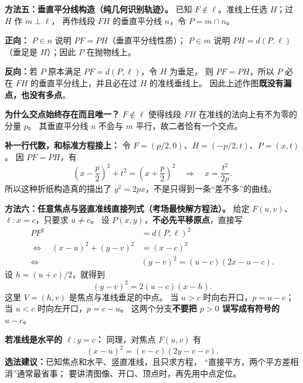 \begin{proofbox}
\textbf{方法五：垂直平分线构造（纯几何识别轨迹）。}
已知 $F\notin\ell$。准线上任选 $H$；过 $H$ 作 $m\perp\ell$，
再作线段 $FH$ 的垂直平分线 $n$，令 $P=m\cap n$。

\textbf{正向：} $P\in n$ 说明 $PF=PH$（垂直平分线性质）；
$P\in m$ 说明 $PH=d(P,\ell)$（垂足是 $H$）；因此 $P$ 在抛物线上。

\textbf{反向：}若 $P$ 原本满足 $PF=d(P,\ell)$，令 $H$ 为垂足，
则 $PF=PH$，所以 $P$ 必在 $FH$ 的垂直平分线上，并且必在过 $H$ 的准线垂线上。
因此上述作图\textbf{既没有漏点，也没有多点}。

\textbf{为什么交点始终存在而且唯一？}
$F\notin\ell$ 使得线段 $FH$ 在准线的法向上有不为零的分量 $p$。
其垂直平分线 $n$ 不会与 $m$ 平行，故二者恰有一个交点。

\textbf{补一行代数，和标准方程接上：}
令 $F=(p/2,0)$、$H=(-p/2,t)$、$P=(x,t)$。
因 $PF=PH$，有
\[
\left(x-\frac p2\right)^2+t^2
=\left(x+\frac p2\right)^2
\quad\Longrightarrow\quad
\boxed{x=\frac{t^2}{2p}}.
\]
所以这种折纸构造真的描出了 $y^2=2px$，不是只得到一条“差不多”的曲线。
\end{proofbox}
\clearpage
\begin{proofbox}
\textbf{方法六：任意焦点与竖直准线直接列式（考场最快解方程法）。}
给定 $F(u,v)$、$\ell:x=c$，只要求 $u\ne c$。
设 $P(x,y)$，\textbf{不必先平移原点}，直接写
\[
\begin{aligned}
PF^2&=d(P,\ell)^2\\
\Longleftrightarrow\quad (x-u)^2+(y-v)^2&=(x-c)^2\\
\Longleftrightarrow\quad
&\boxed{(y-v)^2=(u-c)(2x-u-c)}.
\end{aligned}
\]
设 $h=(u+c)/2$，就得到
\[
\boxed{(y-v)^2=2(u-c)(x-h)}.
\]
这里 $V=(h,v)$ 是焦点与准线垂足的中点。
当 $u>c$ 时向右开口，$p=u-c$；当 $u<c$ 时向左开口，$p=c-u$。
这两个分支\textbf{不要把 $p>0$ 误写成有符号的 $u-c$}。

\textbf{若准线是水平的 $\ell:y=c$：}
同理，对焦点 $F(u,v)$ 有
\[
\boxed{(x-u)^2=(v-c)(2y-v-c)}.
\]
\textbf{选法建议：}已知焦点和水平、竖直准线，且只求方程，
“直接平方，两个平方差相消”通常最省事；
要讲清图像、开口、顶点时，再先用中点定位。
\end{proofbox}
\clearpage
